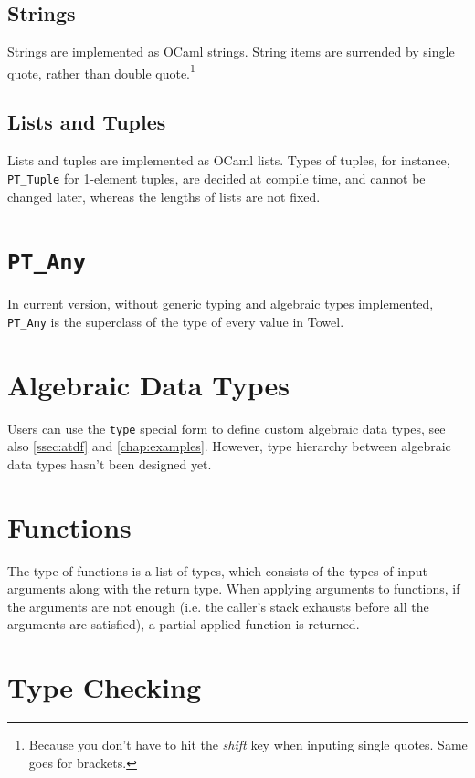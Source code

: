\documentclass{book}
\begin{document}
\subsection{Strings}

Strings are implemented as OCaml strings. String items are surrended by single quote, rather than double quote.\footnote{Because you don't have to hit the \textit{shift} key when inputing single quotes. Same goes for brackets.}

\subsection{Lists and Tuples}

Lists and tuples are implemented as OCaml lists. Types of tuples, for instance, \texttt{PT\_Tuple} for 1-element tuples, are decided at compile time, and cannot be changed later, whereas the lengths of lists are not fixed.

\section{\texttt{PT\_Any}}

In current version, without generic typing and algebraic types implemented, \texttt{PT\_Any} is the superclass of the type of every value in Towel.

\section{Algebraic Data Types}

Users can use the \texttt{type} special form to define custom algebraic data types, see also \autoref{ssec:atdf} and \autoref{chap:examples}. However, type hierarchy between algebraic data types hasn't been designed yet.

\section{Functions}

The type of functions is a list of types, which consists of the types of input arguments along with the return type. When applying arguments to functions, if the arguments are not enough (i.e. the caller's stack exhausts before all the arguments are satisfied), a partial applied function is returned.

\section{Type Checking}
\end{document}
